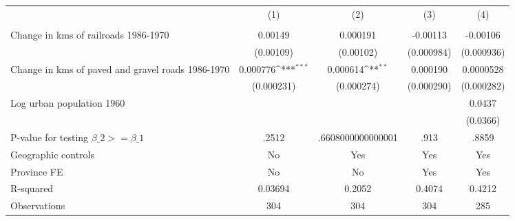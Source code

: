 {
\def\sym#1{\ifmmode^{#1}\else\(^{#1}\)\fi}
\begin{tabular}{l*{4}{c}}
\hline\hline
                &\multicolumn{1}{c}{(1)}&\multicolumn{1}{c}{(2)}&\multicolumn{1}{c}{(3)}&\multicolumn{1}{c}{(4)}\\
                &\multicolumn{1}{c}{}&\multicolumn{1}{c}{}&\multicolumn{1}{c}{}&\multicolumn{1}{c}{}\\
\hline
Change in kms of railroads 1986-1970&  0.00149         & 0.000191         & -0.00113         & -0.00106         \\
                &(0.00109)         &(0.00102)         &(0.000984)         &(0.000936)         \\
[1em]
Change in kms of paved and gravel roads 1986-1970& 0.000776\sym{***}& 0.000614\sym{**} & 0.000190         &0.0000528         \\
                &(0.000231)         &(0.000274)         &(0.000290)         &(0.000282)         \\
[1em]
Log urban population 1960&                  &                  &                  &   0.0437         \\
                &                  &                  &                  & (0.0366)         \\
\hline
P-value for testing $\beta\_{2} >= \beta\_{1}$&    .2512         &.6608000000000001         &     .913         &    .8859         \\
Geographic controls&       No         &      Yes         &      Yes         &      Yes         \\
Province FE     &       No         &       No         &      Yes         &      Yes         \\
R-squared       &  0.03694         &   0.2052         &   0.4074         &   0.4212         \\
Observations    &      304         &      304         &      304         &      285         \\
\hline\hline
\end{tabular}
}
